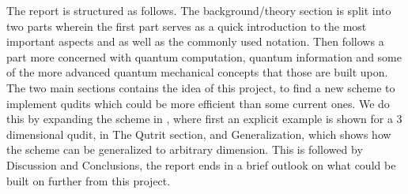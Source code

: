 The report is structured as follows. The background/theory section is split into two parts wherein the first part serves as a quick introduction to the most important aspects and as well as the commonly used notation. Then follows a part more concerned with quantum computation, quantum information and some of the more advanced quantum mechanical concepts that those are built upon.
The two main sections contains the idea of this project, to find a new scheme to implement qudits which could be more efficient than some current ones.  We do this by expanding the scheme in \cite{darkpath}, where first an explicit example is shown for a 3 dimensional qudit, in The Qutrit section, and Generalization, which shows how the scheme can be generalized to arbitrary dimension.
This is followed by Discussion and Conclusions, the report ends in a brief outlook on what could be built on further from this project.

